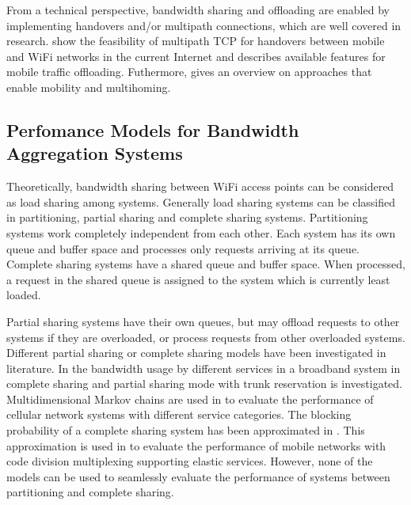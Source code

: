 From a technical perspective, bandwidth sharing and offloading are enabled by implementing handovers and/or multipath connections, which are well covered in research. \cite{gonzalez2013radio,paasch2012exploring,chen2013energy} show the feasibility of multipath TCP for handovers between mobile and WiFi networks in the current Internet and \cite{khadraoui2014survey} describes available features for mobile traffic offloading. Futhermore, \cite{gladisch2014survey} gives an overview on approaches that enable mobility and multihoming.

\subsection{Perfomance Models for Bandwidth Aggregation Systems}\label{sec:aggregation:background:models}

Theoretically, bandwidth sharing between WiFi access points can be considered as load sharing among systems.
Generally load sharing systems can be classified in partitioning, partial sharing and complete sharing systems.
Partitioning systems work completely independent from each other.
Each system has its own queue and buffer space and processes only requests arriving at its queue.
Complete sharing systems have a shared queue and buffer space. When processed, a request in the shared queue is assigned to the system which is currently least loaded.

Partial sharing systems have their own queues, but may offload requests to other systems if they are overloaded, or process requests from other overloaded systems.
Different partial sharing or complete sharing models have been investigated in literature.
In \cite{trangia1993trunk} the bandwidth usage by different services in a broadband system in complete sharing and partial sharing mode with trunk reservation is investigated.
Multidimensional Markov chains are used in \cite{chen2002performance,zhang2006dynamic,ke2010performance} to evaluate the performance of cellular network systems with different service categories.
The blocking probability of a complete sharing system has been approximated in \cite{kaufman1992blocking}.
This approximation is used in \cite{fodor2007bounding} to evaluate the performance of mobile networks with code division multiplexing supporting elastic services.
However, none of the models can be used to seamlessly evaluate the performance of systems between partitioning and complete sharing.

